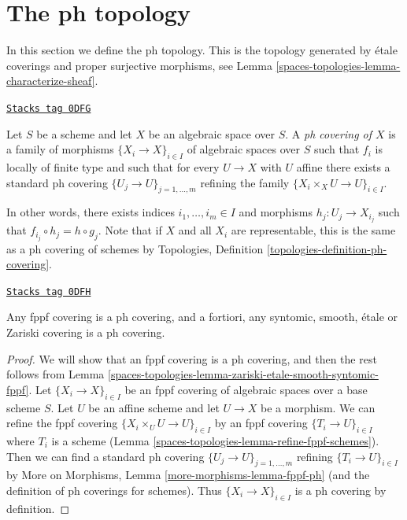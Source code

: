 \section{The ph topology}
\label{spaces-topologies-section-ph}
In this section we define the ph topology. This is the topology
generated by \'etale coverings and proper surjective morphisms, see
Lemma \ref{spaces-topologies-lemma-characterize-sheaf}.

\begin{definition}[Ph covering]
\label{spaces-topologies-definition-ph-covering}
\href{https://stacks.math.columbia.edu/tag/0DFG}{\texttt{Stacks tag 0DFG}}

Let $S$ be a scheme and let $X$ be an algebraic space over $S$.
A {\it ph covering of $X$} is a family
of morphisms $\{X_i \to X\}_{i \in I}$ of algebraic spaces over $S$
such that $f_i$ is locally of finite type and such that for every
$U \to X$ with $U$ affine there exists a standard ph covering
$\{U_j \to U\}_{j = 1, \ldots, m}$ refining the family
$\{X_i \times_X U \to U\}_{i \in I}$.
\end{definition}

In other words, there exists indices $i_1, \ldots, i_m \in I$ and
morphisms $h_j : U_j \to X_{i_j}$ such that
$f_{i_j} \circ h_j = h \circ g_j$. Note that if $X$ and all $X_i$ are
representable, this is the same as a ph covering of schemes by
Topologies, Definition \ref{topologies-definition-ph-covering}.

\begin{lemma}
\label{spaces-topologies-lemma-zariski-etale-smooth-syntomic-fppf-ph}
\href{https://stacks.math.columbia.edu/tag/0DFH}{\texttt{Stacks tag 0DFH}}

Any fppf covering is a ph covering, and a fortiori,
any syntomic, smooth, \'etale or Zariski covering is a ph covering.
\end{lemma}

\begin{proof}
We will show that an fppf covering is a ph covering, and then the
rest follows from Lemma \ref{spaces-topologies-lemma-zariski-etale-smooth-syntomic-fppf}.
Let $\{X_i \to X\}_{i \in I}$ be an fppf covering of algebraic spaces
over a base scheme $S$. Let $U$ be an affine scheme and let
$U \to X$ be a morphism. We can refine the fppf covering
$\{X_i \times_U U \to U\}_{i \in I}$ by an fppf covering
$\{T_i \to U\}_{i \in I}$ where $T_i$ is a scheme
(Lemma \ref{spaces-topologies-lemma-refine-fppf-schemes}).
Then we can find a standard ph covering $\{U_j \to U\}_{j = 1, \ldots, m}$
refining $\{T_i \to U\}_{i \in I}$ by
More on Morphisms, Lemma \ref{more-morphisms-lemma-fppf-ph}
(and the definition of ph coverings for schemes).
Thus $\{X_i \to X\}_{i \in I}$ is a ph covering by definition.
\end{proof}

